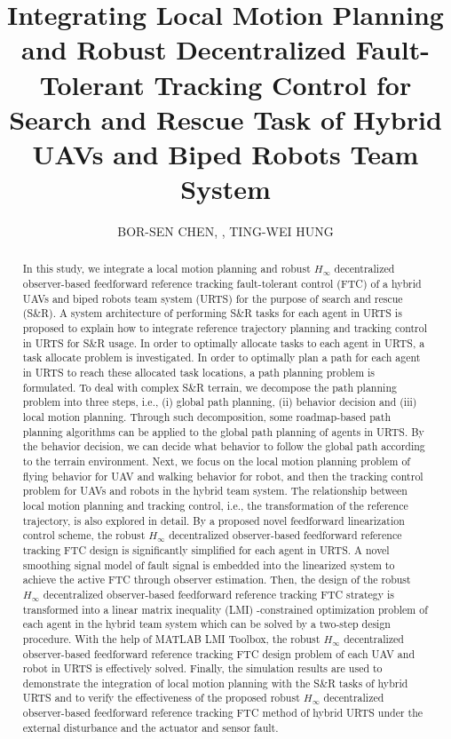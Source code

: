 \documentclass{ieeeaccess}
\title{Integrating Local Motion Planning and Robust Decentralized Fault-Tolerant Tracking Control for Search and Rescue Task of Hybrid UAVs and Biped Robots Team System}
\author{\uppercase{Bor-Sen Chen}\authorrefmark{1,2}, \IEEEmembership{Life
Fellow, IEEE}, \uppercase{Ting-Wei Hung\authorrefmark{1}}}
\begin{document}
\begin{abstract}
In this study, we integrate a local motion planning and robust $H_\infty$ decentralized observer-based feedforward reference tracking fault-tolerant control (FTC) of a hybrid UAVs and biped robots team system (URTS) for the purpose of search and rescue (S\&R). A system architecture of performing S\&R tasks for each agent in URTS is proposed to explain how to integrate reference trajectory planning and tracking control in URTS for S\&R usage. In order to optimally allocate tasks to each agent in URTS, a task allocate problem is investigated. In order to optimally plan a path for each agent in URTS to reach these allocated task locations, a path planning problem is formulated. To deal with complex S\&R terrain, we decompose the path planning problem into three steps, i.e., (i) global path planning, (ii) behavior decision and (iii) local motion planning. Through such decomposition, some roadmap-based path planning algorithms can be applied to the global path planning of agents in URTS. By the behavior decision, we can decide what behavior to follow the global path according to the terrain environment. Next, we focus on the local motion planning problem of flying behavior for UAV and walking behavior for robot, and then the tracking control problem for UAVs and robots in the hybrid team system. The relationship between local motion planning and tracking control, i.e., the transformation of the reference trajectory, is also explored in detail. By a proposed novel feedforward linearization control scheme, the robust $H_\infty$ decentralized observer-based feedforward reference tracking FTC design is significantly simplified for each agent in URTS. A novel smoothing signal model of fault signal is embedded into the linearized system to achieve the active FTC through observer estimation. Then, the design of the robust $H_\infty$ decentralized observer-based feedforward reference tracking FTC strategy is transformed into a linear matrix inequality (LMI) -constrained optimization problem of each agent in the hybrid team system which can be solved by a two-step design procedure. With the help of MATLAB LMI Toolbox, the robust $H_\infty$ decentralized observer-based feedforward reference tracking FTC design problem of each UAV and robot in URTS is effectively solved. Finally, the simulation results are used to demonstrate the integration of local motion planning with the S\&R tasks of hybrid URTS and to verify the effectiveness of the proposed robust $H_\infty$ decentralized observer-based feedforward reference tracking FTC method of hybrid URTS under the external disturbance and the actuator and sensor fault.
\end{abstract}
\end{document}
